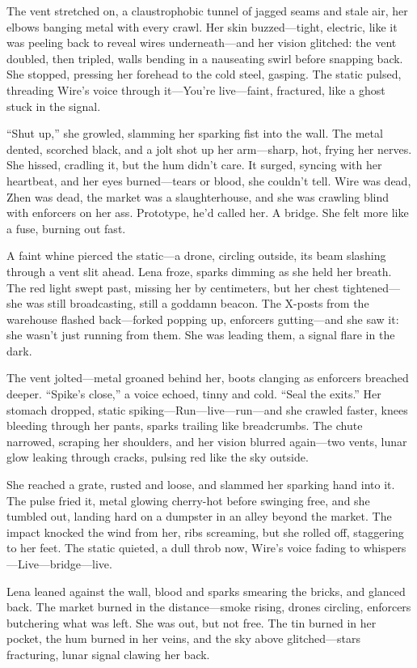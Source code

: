 \documentclass[12pt]{book}
\begin{document}
The vent stretched on, a claustrophobic tunnel of jagged seams and stale air, her elbows banging metal with every crawl. Her skin buzzed—tight, electric, like it was peeling back to reveal wires underneath—and her vision glitched: the vent doubled, then tripled, walls bending in a nauseating swirl before snapping back. She stopped, pressing her forehead to the cold steel, gasping. The static pulsed, threading Wire’s voice through it—You’re live—faint, fractured, like a ghost stuck in the signal.

“Shut up,” she growled, slamming her sparking fist into the wall. The metal dented, scorched black, and a jolt shot up her arm—sharp, hot, frying her nerves. She hissed, cradling it, but the hum didn’t care. It surged, syncing with her heartbeat, and her eyes burned—tears or blood, she couldn’t tell. Wire was dead, Zhen was dead, the market was a slaughterhouse, and she was crawling blind with enforcers on her ass. Prototype, he’d called her. A bridge. She felt more like a fuse, burning out fast.

A faint whine pierced the static—a drone, circling outside, its beam slashing through a vent slit ahead. Lena froze, sparks dimming as she held her breath. The red light swept past, missing her by centimeters, but her chest tightened—she was still broadcasting, still a goddamn beacon. The X-posts from the warehouse flashed back—forked popping up, enforcers gutting—and she saw it: she wasn’t just running from them. She was leading them, a signal flare in the dark.

The vent jolted—metal groaned behind her, boots clanging as enforcers breached deeper. “Spike’s close,” a voice echoed, tinny and cold. “Seal the exits.” Her stomach dropped, static spiking—Run—live—run—and she crawled faster, knees bleeding through her pants, sparks trailing like breadcrumbs. The chute narrowed, scraping her shoulders, and her vision blurred again—two vents, lunar glow leaking through cracks, pulsing red like the sky outside.

She reached a grate, rusted and loose, and slammed her sparking hand into it. The pulse fried it, metal glowing cherry-hot before swinging free, and she tumbled out, landing hard on a dumpster in an alley beyond the market. The impact knocked the wind from her, ribs screaming, but she rolled off, staggering to her feet. The static quieted, a dull throb now, Wire’s voice fading to whispers—Live—bridge—live.

Lena leaned against the wall, blood and sparks smearing the bricks, and glanced back. The market burned in the distance—smoke rising, drones circling, enforcers butchering what was left. She was out, but not free. The tin burned in her pocket, the hum burned in her veins, and the sky above glitched—stars fracturing, lunar signal clawing her back.
\end{document}
